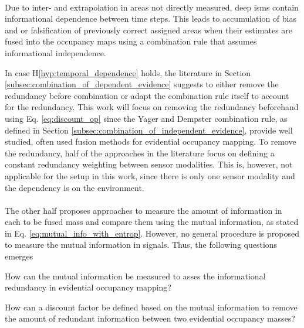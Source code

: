 \\
\begin{hyp} \label{hyp:temporal_dependence}
	Due to inter- and extrapolation in areas not directly measured, deep \gls{ism}s contain informational dependence between time steps. This leads to accumulation of bias and or falsification of previously correct assigned areas when their estimates are fused into the occupancy maps using a combination rule that assumes informational independence.  
\end{hyp} 
In case H\ref{hyp:temporal_dependence} holds, the literature in Section \ref{subsec:combination_of_dependent_evidence} suggests to either remove the redundancy before combination or adapt the combination rule itself to account for the redundancy. This work will focus on removing the redundancy beforehand using Eq. \ref{eq:discount_op} since the Yager and Dempster combination rule, as defined in Section \ref{subsec:combination_of_independent_evidence}, provide well studied, often used fusion methods for evidential occupancy mapping. To remove the redundancy, half of the approaches in the literature focus on defining a constant redundancy weighting between sensor modalities. This is, however, not applicable for the setup in this work, since there is only one sensor modality and the dependency is on the environment.
\\\\
The other half proposes approaches to measure the amount of information in each to be fused mass and compare them using the mutual information, as stated in Eq. \ref{eq:mutual_info_with_entrop}. However, no general procedure is proposed to measure the mutual information in signals. Thus, the following questions emerges
\begin{requ} \label{requ:how_to_meas_redund}
	How can the mutual information be measured to asses the informational redundancy in evidential occupancy mapping?
\end{requ}
\begin{requ} \label{requ:how_to_define_discount_fact}
	How can a discount factor be defined based on the mutual information to remove the amount of redundant information between two evidential occupancy masses?
\end{requ}
